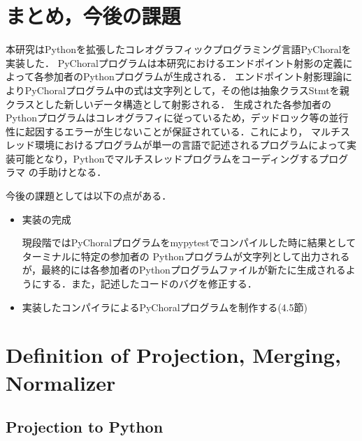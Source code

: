 \documentclass{thesis}
\begin{document}
\chapter{まとめ，今後の課題}
本研究はPythonを拡張したコレオグラフィックプログラミング言語PyChoralを実装した．
PyChoralプログラムは本研究におけるエンドポイント射影の定義によって各参加者のPythonプログラムが生成される．
エンドポイント射影理論によりPyChoralプログラム中の式は文字列として，その他は抽象クラス\textsf{Stmt}を親クラスとした新しいデータ構造として射影される．
生成された各参加者のPythonプログラムはコレオグラフィに従っているため，デッドロック等の並行性に起因するエラーが生じないことが保証されている．これにより，
マルチスレッド環境におけるプログラムが単一の言語で記述されるプログラムによって実装可能となり，Pythonでマルチスレッドプログラムをコーディングするプログラマ
の手助けとなる．

今後の課題としては以下の点がある．
\begin{itemize}
  \item 実装の完成
  
  現段階ではPyChoralプログラムをmypytestでコンパイルした時に結果としてターミナルに特定の参加者の
  Pythonプログラムが文字列として出力されるが，最終的には各参加者のPythonプログラムファイルが新たに生成されるようにする．また，記述したコードのバグを修正する．
  \item 実装したコンパイラによるPyChoralプログラムを制作する(4.5節)
    
\end{itemize}





\appendix

\chapter{Definition of Projection, Merging, Normalizer}
\section{Projection to Python}
\end{document}
